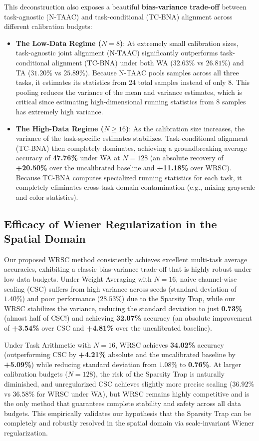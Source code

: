\documentclass{article}
\theoremstyle{plain}
\theoremstyle{definition}
\theoremstyle{remark}
\begin{document}
This deconstruction also exposes a beautiful \textbf{bias-variance trade-off} between task-agnostic (N-TAAC) and task-conditional (TC-BNA) alignment across different calibration budgets:
\begin{itemize}
    \item \textbf{The Low-Data Regime ($N=8$)}: At extremely small calibration sizes, task-agnostic joint alignment (N-TAAC) significantly outperforms task-conditional alignment (TC-BNA) under both WA ($32.63\%$ vs $26.81\%$) and TA ($31.20\%$ vs $25.89\%$). Because N-TAAC pools samples across all three tasks, it estimates its statistics from 24 total samples instead of only 8. This pooling reduces the variance of the mean and variance estimates, which is critical since estimating high-dimensional running statistics from 8 samples has extremely high variance.
    \item \textbf{The High-Data Regime ($N \geq 16$)}: As the calibration size increases, the variance of the task-specific estimates stabilizes. Task-conditional alignment (TC-BNA) then completely dominates, achieving a groundbreaking average accuracy of \textbf{47.76\%} under WA at $N=128$ (an absolute recovery of \textbf{+20.50\%} over the uncalibrated baseline and \textbf{+11.18\%} over WRSC). Because TC-BNA computes specialized running statistics for each task, it completely eliminates cross-task domain contamination (e.g., mixing grayscale and color statistics).
\end{itemize}

\subsection{Efficacy of Wiener Regularization in the Spatial Domain}
Our proposed WRSC method consistently achieves excellent multi-task average accuracies, exhibiting a classic bias-variance trade-off that is highly robust under low data budgets. Under Weight Averaging with $N=16$, naive channel-wise scaling (CSC) suffers from high variance across seeds (standard deviation of $1.40\%$) and poor performance ($28.53\%$) due to the Sparsity Trap, while our WRSC stabilizes the variance, reducing the standard deviation to just \textbf{0.73\%} (almost half of CSC!) and achieving \textbf{32.07\%} accuracy (an absolute improvement of \textbf{+3.54\%} over CSC and \textbf{+4.81\%} over the uncalibrated baseline). 

Under Task Arithmetic with $N=16$, WRSC achieves \textbf{34.02\%} accuracy (outperforming CSC by \textbf{+4.21\%} absolute and the uncalibrated baseline by \textbf{+5.09\%}) while reducing standard deviation from $1.08\%$ to \textbf{0.76\%}. At larger calibration budgets ($N=128$), the risk of the Sparsity Trap is naturally diminished, and unregularized CSC achieves slightly more precise scaling ($36.92\%$ vs $36.58\%$ for WRSC under WA), but WRSC remains highly competitive and is the only method that guarantees complete stability and safety across all data budgets. This empirically validates our hypothesis that the Sparsity Trap can be completely and robustly resolved in the spatial domain via scale-invariant Wiener regularization.
\end{document}
